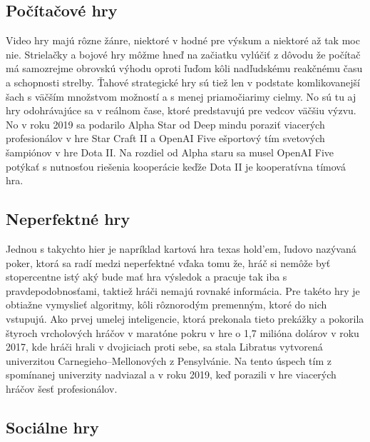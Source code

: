 \documentclass{article}
\begin{document}
\subsection{Počítačové hry}
Video hry majú rôzne žánre, niektoré v hodné pre výskum a niektoré až tak moc nie. Strielačky a bojové hry môžme hneď na začiatku vylúčiť z dôvodu že počítač má samozrejme obrovskú výhodu oproti ľuďom kôli nadľudskému reakčnému času a schopnosti strelby. Ťahové strategické hry sú tiež len v podstate komlikovanejší šach s väčším množstvom možností a s menej priamočiarimy cielmy. No sú tu aj hry odohrávajúce sa v reálnom čase, ktoré predstavujú pre vedcov väčšiu výzvu. No v roku 2019 sa podarilo Alpha Star od Deep mindu poraziť viacerých profesionálov v hre Star Craft II a OpenAI Five ešportový tím svetových šampiónov v hre Dota II. Na rozdiel od Alpha staru sa musel OpenAI Five potýkať s nutnosťou riešenia kooperácie keďže Dota II je kooperatívna tímová hra.

\subsection{Neperfektné hry}

Jednou s takychto hier je napríklad kartová hra texas hold'em, ľudovo nazývaná poker, ktorá sa radí medzi neperfektné vďaka tomu že, hráč si nemôže byť stopercentne istý aký bude mať hra výsledok a pracuje tak iba s pravdepodobnosťami, taktiež hráči nemajú rovnaké informácia. Pre takéto hry je obtiažne vymyslieť algoritmy, kôli rôznorodým premenným, ktoré do nich vstupujú. Ako prvej umelej inteligencie, ktorá prekonala tieto prekážky a pokorila štyroch vrcholových hráčov v maratóne pokru v hre o 1,7 milióna dolárov v roku 2017, kde hráči hrali v dvojiciach proti sebe, sa stala Libratus vytvorená univerzitou Carnegieho–Mellonových z Pensylvánie\cite{Reuters}. Na tento úspech tím z spomínanej univerzity nadviazal a v roku 2019, keď porazili v hre viacerých hráčov šesť profesionálov\cite{Nature}. 

\subsection{Sociálne hry}
\end{document}
